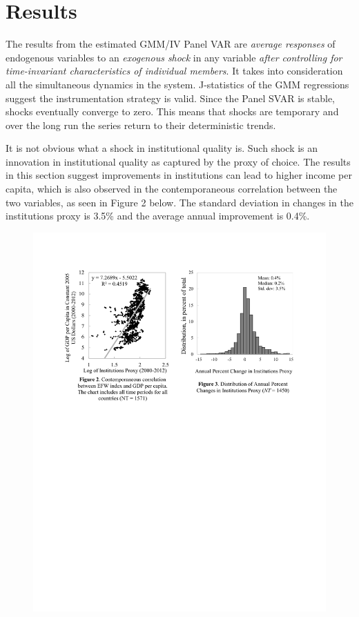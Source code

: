 \documentclass{article}
\begin{document}
\section{Results}

The results from the estimated GMM/IV Panel VAR are \textit{average responses} of endogenous variables to an \textit{exogenous shock} in any variable \textit{after controlling for time-invariant characteristics of individual members}. It takes into consideration all the simultaneous dynamics in the system. J-statistics of the GMM regressions suggest the instrumentation strategy is valid. Since the Panel SVAR is stable, shocks eventually converge to zero. This means that shocks are temporary and over the long run the series return to their deterministic trends.

It is not obvious what a shock in institutional quality is. Such shock is an innovation in institutional quality as captured by the proxy of choice. The results in this section suggest improvements in institutions can lead to higher income per capita, which is also observed in the contemporaneous correlation between the two variables, as seen in Figure 2 below. The standard deviation in changes in the institutions proxy is 3.5\% and the average annual improvement is 0.4\%. 

\begin{figure}[ht]
\begin{center}
    \includegraphics[scale=0.675]{distribution.pdf}
\end{center}
\end{figure}
\end{document}
